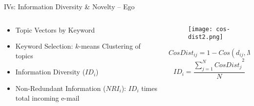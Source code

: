 \begin{frame}{{\color{violet}IVs: Information Diversity \& {\color{salmon}Novelty} -- Ego}}

  \begin{columns}

    \begin{column}{0.5\linewidth}
      \begin{itemize}
        \item Topic Vectors by Keyword
        \item Keyword Selection: $k$-means Clustering of topics
        \item Information Diversity (${ID}_i$)
        \item {\color{salmon}Non-Redundant} Information (${NRI}_i$): ${ID}_i$ times total incoming e-mail 
      \end{itemize}
    \end{column}

    \begin{column}{0.5\linewidth}
      \begin{figure}
        \centering
        \texttt{[image: cos-dist2.png]}
      \end{figure}
      $${CosDist}_{ij} = 1 - Cos(d_{ij},M_{i})$$
      $${ID}_{i} = \frac{{\sum_{j=1}^{N} {CosDist}_{j}}^2}{N}$$
    \end{column}
    
  \end{columns}


\end{frame}
